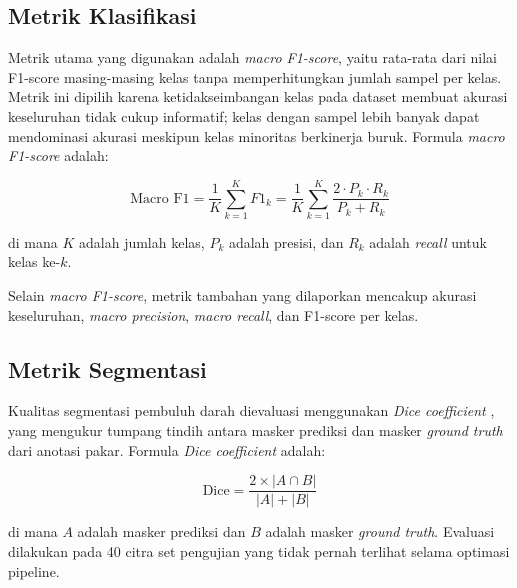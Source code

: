 \subsection{Metrik Klasifikasi}

Metrik utama yang digunakan adalah \textit{macro F1-score}, yaitu rata-rata dari nilai
F1-score masing-masing kelas tanpa memperhitungkan jumlah sampel per kelas. Metrik ini dipilih
karena ketidakseimbangan kelas pada dataset membuat akurasi keseluruhan tidak cukup informatif;
kelas dengan sampel lebih banyak dapat mendominasi akurasi meskipun kelas minoritas
berkinerja buruk. Formula \textit{macro F1-score} adalah:

\begin{equation}
  \text{Macro F1} = \frac{1}{K} \sum_{k=1}^{K} F1_k = \frac{1}{K} \sum_{k=1}^{K}
  \frac{2 \cdot P_k \cdot R_k}{P_k + R_k}
  \label{eq:macro_f1}
\end{equation}

\noindent di mana $K$ adalah jumlah kelas, $P_k$ adalah presisi, dan $R_k$ adalah \textit{recall}
untuk kelas ke-$k$.

Selain \textit{macro F1-score}, metrik tambahan yang dilaporkan mencakup akurasi keseluruhan,
\textit{macro precision}, \textit{macro recall}, dan F1-score per kelas.

\subsection{Metrik Segmentasi}

Kualitas segmentasi pembuluh darah dievaluasi menggunakan \textit{Dice coefficient}
\citep{Sorensen1948}, yang mengukur tumpang tindih antara masker prediksi dan masker
\textit{ground truth} dari anotasi pakar. Formula \textit{Dice coefficient} adalah:

\begin{equation}
  \text{Dice} = \frac{2 \times |A \cap B|}{|A| + |B|}
  \label{eq:dice}
\end{equation}

\noindent di mana $A$ adalah masker prediksi dan $B$ adalah masker \textit{ground truth}.
Evaluasi dilakukan pada 40 citra set pengujian yang tidak pernah terlihat selama optimasi
pipeline.
